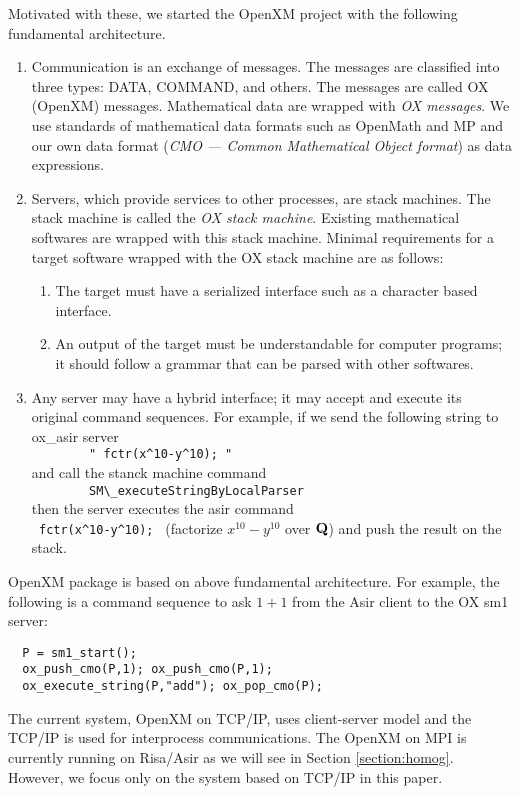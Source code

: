 Motivated with these, we started the OpenXM project with the following
fundamental architecture.
\begin{enumerate}
\item Communication is an exchange of messages. The messages are classified into
three types:
DATA, COMMAND, and others.
The messages are called OX (OpenXM) messages.
Mathematical data are wrapped with {\it OX messages}.
We use standards of mathematical data formats such as OpenMath and MP
and our own data format ({\it CMO --- Common Mathematical Object format})
as data expressions.
\item Servers, which provide services to other processes, are stack machines.
The stack machine is called the
{\it OX stack machine}.
Existing mathematical softwares are wrapped with this stack machine.
Minimal requirements for a target software wrapped with the OX stack machine
are as follows:
\begin{enumerate}
\item The target must have a serialized interface such as a character based
interface.
\item An output of the target must be understandable for computer programs;
it should follow a grammar that can be parsed with other softwares.
\end{enumerate}
\item Any server may have a hybrid interface;
it may accept and execute its original command sequences.
For example,
if we send the following string to ox\_asir server \\
\verb+        " fctr(x^10-y^10); "      + \\
and call the stanck machine command  \\
\verb+        SM\_executeStringByLocalParser    + \\ 
then the server executes the asir command \\
\verb+ fctr(x^10-y^10); + 
(factorize $x^10-y^10$ over ${\bf Q}$)
and push the result on the stack.
\end{enumerate}
OpenXM package  is based on above fundamental architecture.
For example, the following is a command sequence to ask $1+1$ from
the Asir client to the OX sm1 server:
\begin{verbatim}
  P = sm1_start();
  ox_push_cmo(P,1); ox_push_cmo(P,1);
  ox_execute_string(P,"add"); ox_pop_cmo(P);
\end{verbatim}
The current system, OpenXM on TCP/IP, 
uses client-server model and the TCP/IP is used for interprocess
communications.
The OpenXM on MPI \cite{MPI} is currently running on Risa/Asir
as we will see in Section \ref{section:homog}.
However, we focus only on the system based on TCP/IP in this paper.





